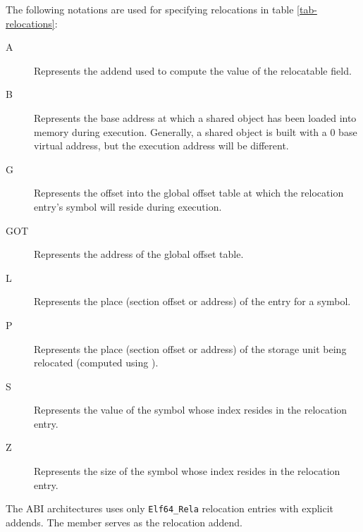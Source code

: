 The following notations are used for specifying relocations in table
\ref{tab-relocations}:
\begin{description}
\item[A] Represents the addend used to compute the value of the
  relocatable field.
\item[B] Represents the base address at which a shared object has been
  loaded into memory during execution.  Generally, a shared object is
  built with a 0 base virtual address, but the execution address will
  be different.
\item[G] Represents the offset into the global offset table at which 
  the relocation entry's symbol will reside during execution.
\item[GOT] Represents the address of the global offset table.
\item[L] Represents the place (section offset or address) of the
   entry for a symbol.
\item[P] Represents the place (section offset or address) of the
  storage unit being relocated (computed using ).
\item[S] Represents the value of the symbol whose index resides in the
  relocation entry.
\item[Z] Represents the size of the symbol whose index resides in the
  relocation entry.
\end{description}

The \xARCH ABI architectures uses only \texttt{Elf64_Rela} relocation
entries with explicit addends.  The  member serves as
the relocation addend.

